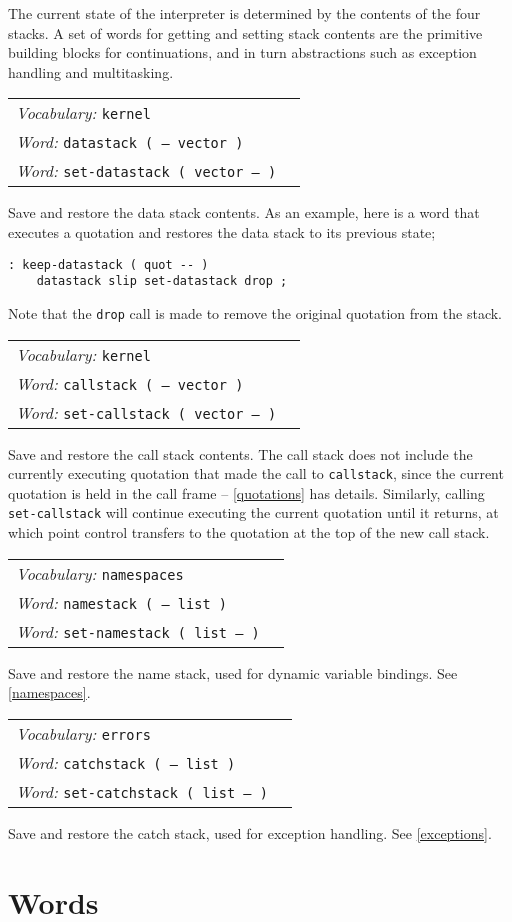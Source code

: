 \documentclass{book}
\newcommand{\vocabulary}[1]{\emph{Vocabulary:} \texttt{#1}&\\}
\newcommand{\ordinaryword}[2]{\index{\texttt{#1}}\emph{Word:} \texttt{#2}&\\}
\newcommand{\wordtable}[1]{


\begin{tabularx}{12cm}{lX}
\hline
#1
\hline
\end{tabularx}

}
\begin{document}
The current state of the interpreter is determined by the contents of the four stacks. A set of words for getting and setting stack contents are the primitive building blocks for continuations, and in turn abstractions such as exception handling and multitasking.
\wordtable{
\vocabulary{kernel}
\ordinaryword{datastack}{datastack ( -- vector )}
\ordinaryword{set-datastack}{set-datastack ( vector -- )}

}
Save and restore the data stack contents. As an example, here is a word that executes a quotation and restores the data stack to its previous state;
\begin{verbatim}
: keep-datastack ( quot -- )
    datastack slip set-datastack drop ;
\end{verbatim}
Note that the \texttt{drop} call is made to remove the original quotation from the stack.
\wordtable{
\vocabulary{kernel}
\ordinaryword{callstack}{callstack ( -- vector )}
\ordinaryword{set-callstack}{set-callstack ( vector -- )}

}
Save and restore the call stack contents. The call stack does not include the currently executing quotation that made the call to \texttt{callstack}, since the current quotation is held in the call frame -- \ref{quotations} has details. Similarly, calling \texttt{set-callstack} will continue executing the current quotation until it returns, at which point control transfers to the quotation at the top of the new call stack.
\wordtable{
\vocabulary{namespaces}
\ordinaryword{namestack}{namestack ( -- list )}
\ordinaryword{set-namestack}{set-namestack ( list -- )}
}
Save and restore the name stack, used for dynamic variable bindings. See \ref{namespaces}.
\wordtable{
\vocabulary{errors}
\ordinaryword{catchstack}{catchstack ( -- list )}
\ordinaryword{set-catchstack}{set-catchstack ( list -- )}

}
Save and restore the catch stack, used for exception handling. See \ref{exceptions}.

\chapter{Words}\label{words}
\end{document}
